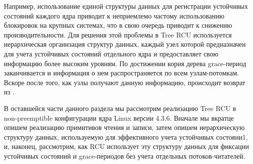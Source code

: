Например, использование единой структуры данных для регистрации устойчивых
состояний каждого ядра приводит к неприемлемо частому использованию
блокировок на крупных системах, что в свою очередь приводит к снижению
производительности.
Для решения этой проблемы в Tree RCU используется иерархическая организация
структур данных, каждый узел которой предназначен для учета устойчивых
состояний отдельного ядра и предоставляет свою информацию более высоким уровням.
По достижении корня дерева grace-период заканчивается и
информация о нем распространяется по всем узлам-потомкам.
Вскоре после того, как узлы получают данную информацию,
происходит возврат из .

В оставшейся части данного раздела мы рассмотрим реализацию Tree RCU
в non-preemptible конфигурации ядра Linux версии 4.3.6.
Вначале мы вкратце опишем реализацию примитивов чтения и записи,
затем опишем иерархическую структуру данных, используемую для эффективного
учета устойчивых состояни1, и, наконец, рассмотрим, как RCU использует
эту структуру данных для фиксации устойчивых состояний и grace-периодов
без учета отдельных потоков-читателей.






